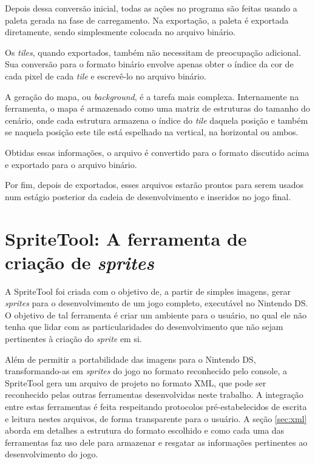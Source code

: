 \documentclass[brazil]{abnt}
\begin{document}
Depois dessa conversão inicial, todas as ações no programa são feitas usando a paleta gerada na fase de carregamento. Na exportação, a paleta é exportada diretamente, sendo simplesmente colocada no arquivo binário.

Os \textit{tiles}, quando exportados, também não necessitam de preocupação adicional. Sua conversão para o formato binário envolve apenas obter o índice da cor de cada pixel de cada \textit{tile} e escrevê-lo no arquivo binário.

A geração do mapa, ou \textit{background}, é a tarefa mais complexa. Internamente na ferramenta, o mapa é armazenado como uma matriz de estruturas do tamanho do cenário, onde cada estrutura armazena o índice do \textit{tile} daquela posição e também se naquela posição este tile está espelhado na vertical, na horizontal ou ambos.

Obtidas essas informações, o arquivo é convertido para o formato discutido acima e exportado para o arquivo binário.



Por fim, depois de exportados, esses arquivos estarão prontos para serem usados num estágio posterior da cadeia de desenvolvimento e inseridos no jogo final.

\section{SpriteTool: A ferramenta de criação de \textit{sprites}}

A SpriteTool foi criada com o objetivo de, a partir de simples imagens, gerar \textit{sprites} para o desenvolvimento de um jogo completo, executável no Nintendo DS. O objetivo de tal ferramenta é criar um ambiente para o usuário, no qual ele não tenha que lidar com as particularidades do desenvolvimento que não sejam pertinentes à criação do \textit{sprite} em si.

Além de permitir a portabilidade das imagens para o Nintendo DS, transformando-as em \textit{sprites} do jogo no formato reconhecido pelo console, a SpriteTool gera um arquivo de projeto no formato XML, que pode ser reconhecido pelas outras ferramentas desenvolvidas neste trabalho. A integração entre estas ferramentas é feita respeitando protocolos pré-estabelecidos de escrita e leitura nestes arquivos, de forma transparente para o usuário. A seção \ref{sec:xml} aborda em detalhes a estrutura do formato escolhido e como cada uma das ferramentas faz uso dele para armazenar e resgatar as informações pertinentes ao desenvolvimento do jogo.
\end{document}
